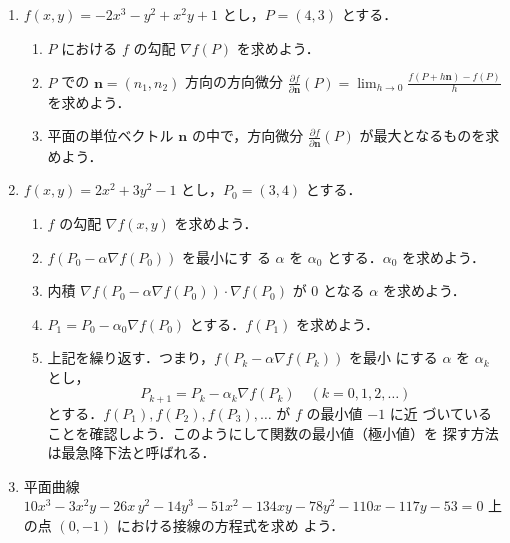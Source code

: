 \documentclass[11pt, uplatex, dvipdfmx, twoside]{jsarticle}
\newcommand{\ds}{\displaystyle}
\begin{document}
\begin{enumerate}[label=\arabic{section}.\arabic*]

  \setlength{\itemsep}{1zh}
  
\item $f(x,y) = -2x^3-y^2+x^2y+1$ とし，$\ds P=(4,3)$ とする．

  \vspace{1ex}

  \begin{enumerate}[label=(\arabic*)]
    \setlength{\itemsep}{1ex}
    
  \item $P$ における $f$ の勾配 $\nabla f(P)$ を求めよう．

  \item $P$ での $\bm{n} = (n_1, n_2)$ 方向の方向微分
    $\ds \frac{\partial f}{\partial \bm{n}}(P) = \lim_{h \to 0}
    \frac{f(P+h\bm{n}) - f(P)}{h}$ を求めよう．

  \item 平面の単位ベクトル $\bm{n}$ の中で，方向微分
    $\ds \frac{\partial f}{\partial \bm{n}}(P)$ が最大となるものを求めよう．
  \end{enumerate}

\item $f(x,y) = 2x^2+3y^2-1$ とし，$P_0=(3,4)$ とする．

  \vspace{1ex}
  
  \begin{enumerate}[label=(\arabic*)]
    \setlength{\itemsep}{1ex}
    
  \item $f$ の勾配 $\nabla f(x,y)$ を求めよう．

  \item $f(P_0 - \alpha \nabla f(P_0))$ を最小にす
    る $\alpha$ を $\alpha_0$ とする．$\alpha_0$ を求めよう．

  \item 内積
    $\nabla f\left(P_0 - \alpha \nabla f(P_0)\right) \cdot \nabla
    f(P_0)$ が $0$ となる $\alpha$ を求めよう．

  \item $P_1 = P_0  - \alpha_0 \nabla f(P_0)$ とする．$f(P_1)$ を求めよう．

  \item 上記を繰り返す．つまり，$f(P_k - \alpha \nabla f(P_k))$ を最小
    にする $\alpha$ を $\alpha_k$
    とし，
    \[
      P_{k+1} = P_{k} - \alpha_k \nabla f(P_k) \quad (k=0,1,2,\ldots)
    \]
    とする．$f(P_1), f(P_2), f(P_3), \ldots $ が $f$ の最小値 $-1$ に近
    づいていることを確認しよう．このようにして関数の最小値（極小値）を
    探す方法は最急降下法と呼ばれる．
  \end{enumerate}

\item 平面曲線
  $ 10 x^{3}-3 x^{2} y -26 x \,y^{2}-14 y^{3}-51 x^{2}-134 x y -78
  y^{2}-110 x -117 y -53=0$ 上の点 $(0,-1)$ における接線の方程式を求め
  よう．
  
\end{enumerate}
\end{document}
